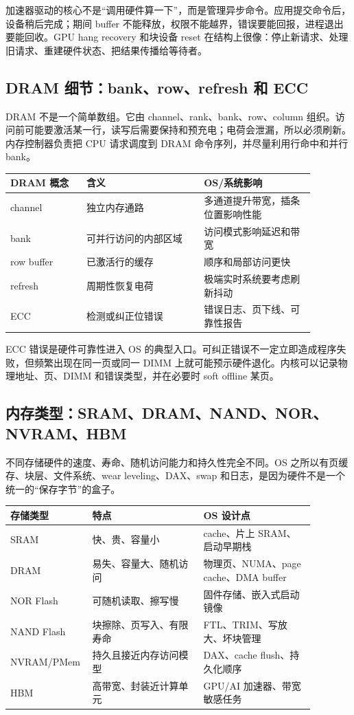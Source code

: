 加速器驱动的核心不是“调用硬件算一下”，而是管理异步命令。应用提交命令后，设备稍后完成；期间 buffer 不能释放，权限不能越界，错误要能回报，进程退出要能回收。GPU hang recovery 和块设备 reset 在结构上很像：停止新请求、处理旧请求、重建硬件状态、把结果传播给等待者。

\subsection{DRAM 细节：bank、row、refresh 和 ECC}

DRAM 不是一个简单数组。它由 channel、rank、bank、row、column 组织。访问前可能要激活某一行，读写后需要保持和预充电；电荷会泄漏，所以必须刷新。内存控制器负责把 CPU 请求调度到 DRAM 命令序列，并尽量利用行命中和并行 bank。

\begin{longtable}{p{0.22\linewidth}p{0.34\linewidth}p{0.32\linewidth}}
\toprule
DRAM 概念 & 含义 & OS/系统影响 \\
\midrule
channel & 独立内存通路 & 多通道提升带宽，插条位置影响性能 \\
bank & 可并行访问的内部区域 & 访问模式影响延迟和带宽 \\
row buffer & 已激活行的缓存 & 顺序和局部访问更快 \\
refresh & 周期性恢复电荷 & 极端实时系统要考虑刷新抖动 \\
ECC & 检测或纠正位错误 & 错误日志、页下线、可靠性报告 \\
\bottomrule
\end{longtable}

ECC 错误是硬件可靠性进入 OS 的典型入口。可纠正错误不一定立即造成程序失败，但频繁出现在同一页或同一 DIMM 上就可能预示硬件退化。内核可以记录物理地址、页、DIMM 和错误类型，并在必要时 soft offline 某页。

\subsection{内存类型：SRAM、DRAM、NAND、NOR、NVRAM、HBM}

不同存储硬件的速度、寿命、随机访问能力和持久性完全不同。OS 之所以有页缓存、块层、文件系统、wear leveling、DAX、swap 和日志，是因为硬件不是一个统一的“保存字节”的盒子。

\begin{longtable}{p{0.18\linewidth}p{0.35\linewidth}p{0.35\linewidth}}
\toprule
存储类型 & 特点 & OS 设计点 \\
\midrule
SRAM & 快、贵、容量小 & cache、片上 SRAM、启动早期栈 \\
DRAM & 易失、容量大、随机访问 & 物理页、NUMA、page cache、DMA buffer \\
NOR Flash & 可随机读取、擦写慢 & 固件存储、嵌入式启动镜像 \\
NAND Flash & 块擦除、页写入、有限寿命 & FTL、TRIM、写放大、坏块管理 \\
NVRAM/PMem & 持久且接近内存访问模型 & DAX、cache flush、持久化顺序 \\
HBM & 高带宽、封装近计算单元 & GPU/AI 加速器、带宽敏感任务 \\
\bottomrule
\end{longtable}

